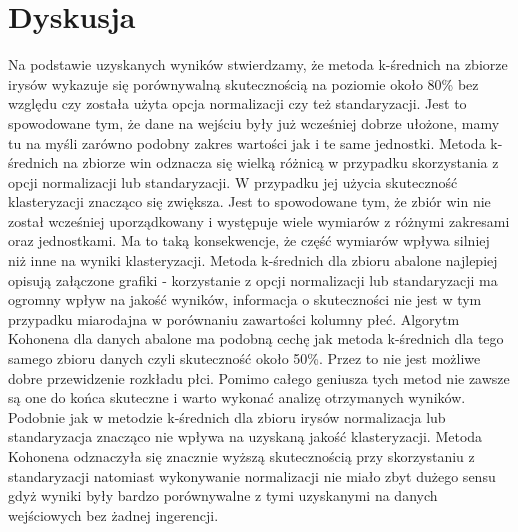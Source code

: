 \documentclass{classrep}
\begin{document}
{\section{Dyskusja}
{
Na podstawie uzyskanych wyników stwierdzamy, że metoda k-średnich na zbiorze irysów wykazuje się porównywalną
skutecznością na poziomie około 80\% bez względu czy została użyta opcja normalizacji czy też standaryzacji.
Jest to spowodowane tym, że dane na wejściu były już wcześniej dobrze ułożone, mamy tu na myśli zarówno podobny
zakres wartości jak i te same jednostki. Metoda k-średnich na zbiorze win odznacza się wielką różnicą w przypadku
skorzystania z opcji normalizacji lub standaryzacji. W przypadku jej użycia skuteczność klasteryzacji znacząco się
zwiększa. Jest to spowodowane tym, że zbiór win nie został wcześniej uporządkowany i występuje wiele wymiarów z
różnymi zakresami oraz jednostkami. Ma to taką konsekwencje, że część wymiarów wpływa silniej niż inne na wyniki
klasteryzacji. Metoda k-średnich dla zbioru abalone najlepiej opisują załączone grafiki - korzystanie z opcji
normalizacji lub standaryzacji ma ogromny wpływ na jakość wyników, informacja o skuteczności nie jest w tym przypadku
miarodajna w porównaniu zawartości kolumny płeć. Algorytm Kohonena dla danych abalone ma podobną cechę jak metoda
k-średnich dla tego samego zbioru danych czyli skuteczność około 50\%. Przez to nie jest możliwe dobre przewidzenie
rozkładu płci. Pomimo całego geniusza tych metod nie zawsze są one do końca skuteczne i warto wykonać analizę
otrzymanych wyników. Podobnie jak w metodzie k-średnich dla zbioru irysów normalizacja lub standaryzacja znacząco
nie wpływa na uzyskaną jakość klasteryzacji. Metoda Kohonena odznaczyła się znacznie wyższą skutecznością przy
skorzystaniu z standaryzacji natomiast wykonywanie normalizacji nie miało zbyt dużego sensu gdyż wyniki były bardzo
porównywalne z tymi uzyskanymi na danych wejściowych bez żadnej ingerencji.\\

}}
\end{document}
